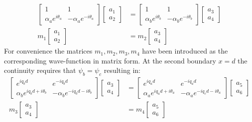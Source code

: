 \documentclass[12pt,a4paper]{article}
\begin{document}
		\begin{align}
			\left[\begin{array}{ccc}
				1&1\\
				\alpha_{a}e^{i\theta_{a}}&-\alpha_{a}e^{-i\theta_{a}}
			\end{array}\right]
			\left[\begin{array}{ccc}
				a_{1}\\
				a_{2}
			\end{array}\right]
			&=
			\left[\begin{array}{ccc}
				1&1\\
				\alpha_{b}e^{i\theta_{b}}&-\alpha_{b}e^{-i\theta_{b}}
			\end{array}\right]
			\left[\begin{array}{ccc}
				a_{3}\\
				a_{4}
			\end{array}\right]\\
			m_{1}\left[\begin{array}{ccc}
				a_{1}\\
				a_{2}
			\end{array}\right]
			&=
			m_{2}\left[\begin{array}{ccc}
				a_{3}\\
				a_{4}
			\end{array}\right]
		\end{align}
		For convenience the matrices $m_{1}, m_{2}, m_{3}, m_{4}$ have been introduced as the corresponding wave-function in matrix form. At the second boundary $x=d$ the continuity requires that $\psi_{b}=\psi_{c}$ resulting in:
		\begin{align}
			\left[\begin{array}{ccc}
				e^{iq_{b}d}&e^{-iq_{b}d}\\
				\alpha_{b}e^{iq_{b}d+i\theta_{b}}&-\alpha_{b}e^{-iq_{b}d-i\theta_{b}}
			\end{array}\right]
			\left[\begin{array}{ccc}
				a_{3}\\
				a_{4}
			\end{array}\right]
			&=
			\left[\begin{array}{ccc}
				e^{iq_{a}d}&e^{-iq_{a}d}\\
				\alpha_{a}e^{iq_{a}d+i\theta_{a}}&-\alpha_{a}e^{-iq_{c}d-i\theta_{a}}
			\end{array}\right]
			\left[\begin{array}{ccc}
				a_{5}\\
				a_{6}
			\end{array}\right]\\
			m_{3}\left[\begin{array}{ccc}
				a_{3}\\
				a_{4}
			\end{array}\right]
			&=
			m_{4}\left[\begin{array}{ccc}
				a_{5}\\
				a_{6}
			\end{array}\right]
		\end{align}
\end{document}
